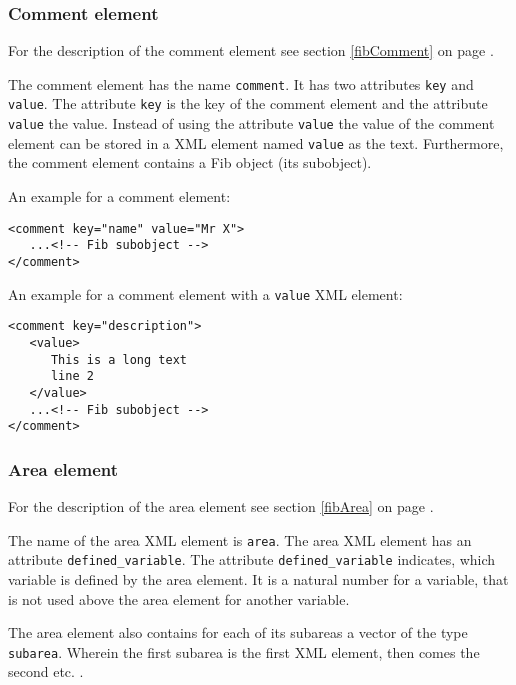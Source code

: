 

\subsubsection{Comment element}

For the description of the comment element see section \ref{fibComment} on page \pageref{fibComment} .

The comment element has the name \verb|comment|. It has two attributes \verb|key| and \verb|value|. The attribute \verb|key| is the key of the comment element and the attribute \verb|value| the value. Instead of using the attribute \verb|value| the value of the comment element can be stored in a XML element named \verb|value| as the text.
Furthermore, the comment element contains a Fib object (its subobject).

\bigskip\noindent
An example for a comment element:
\begin{verbatim}
<comment key="name" value="Mr X">
   ...<!-- Fib subobject -->
</comment>
\end{verbatim}

\noindent
An example for a comment element with a \verb|value| XML element:
\begin{verbatim}
<comment key="description">
   <value>
      This is a long text
      line 2
   </value>
   ...<!-- Fib subobject -->
</comment>
\end{verbatim}





\subsubsection{Area element}

For the description of the area element see section \ref{fibArea} on page \pageref{fibArea} .

The name of the area XML element is \verb|area|. The area XML element has an attribute \verb|defined_variable|. The attribute \verb|defined_variable| indicates, which variable is defined by the area element. It is a natural number for a variable, that is not used above the area element for another variable.

The area element also contains for each of its subareas a vector of the type \verb|subarea|. Wherein the first subarea is the first XML element, then comes the second etc. .

